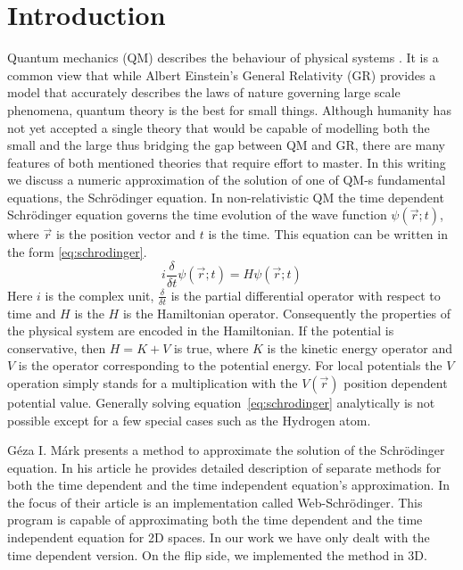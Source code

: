 \section{Introduction}

Quantum mechanics (QM) describes the behaviour of physical systems \cite{schwabl2007quantum}.
It is a common view that while Albert Einstein's General Relativity (GR) \cite{wald2010general} provides a model that accurately describes the laws of nature governing large scale phenomena, quantum theory is the best for small things.
Although humanity has not yet accepted a single theory that would be capable of modelling both the small and the large thus bridging the gap between QM and GR, there are many features of both mentioned theories that require effort to master.
In this writing we discuss a numeric approximation of the solution of one of QM-s fundamental equations,
the Schrödinger equation.
In non-relativistic QM the time dependent Schrödinger equation \cite{schrodinger1926} governs the time evolution of the wave function $\psi(\vec{r}; t)$, where $\vec{r}$ is the position vector and $t$ is the time.
This equation can be written in the form \ref{eq:schrodinger}.
\begin{equation}
	\label{eq:schrodinger}
	i\frac{\delta}{\delta{}t}\psi(\vec{r}; t) = H \psi(\vec{r}; t)
\end{equation}
Here $i$ is the complex unit, $\frac{\delta}{\delta{}t}$ is the partial differential operator with respect to time and $H$ is the $H$ is the Hamiltonian operator.
Consequently the properties of the physical system are encoded in the Hamiltonian.
If the potential is conservative, then $H = K + V$ is true, where $K$ is the kinetic energy operator and $V$ is the operator corresponding to the potential energy.
For local potentials the $V$ operation simply stands for a multiplication with the $V(\vec{r})$ position dependent potential value.
Generally solving equation~\ref{eq:schrodinger} analytically is not possible except for a few special cases such as the Hydrogen atom.

Géza I. Márk \cite{mark2020webschrodinger} presents a method to approximate the solution of the Schrödinger equation.
In his article he provides detailed description of separate methods for both the time dependent and the time independent equation's approximation.
In the focus of their article is an implementation called Web-Schrödinger.
This program is capable of approximating both the time dependent and the time independent equation for 2D spaces.
In our work we have only dealt with the time dependent version.
On the flip side, we implemented the method in 3D.





